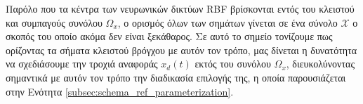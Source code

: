 \begin{remark}
	Παρόλο που τα κέντρα των νευρωνικών δικτύων RBF βρίσκονται εντός του κλειστού και συμπαγούς συνόλου $\Omega_x$, ο ορισμός όλων των σημάτων γίνεται σε ένα σύνολο $\mathcal{X}$ ο σκοπός του οποίο ακόμα δεν είναι ξεκάθαρος. Σε αυτό το σημείο τονίζουμε πως ορίζοντας τα σήματα κλειστού βρόγχου με αυτόν τον τρόπο, μας δίνεται η δυνατότητα να σχεδιάσουμε την τροχιά αναφοράς $x_d(t)$ εκτός του συνόλου $\Omega_x$, διευκολύνοντας σημαντικά με αυτόν τον τρόπο την διαδικασία επιλογής της, η οποία παρουσιάζεται στην Ενότητα \ref{subsec:schema_ref_parameterization}. \\
\end{remark}

